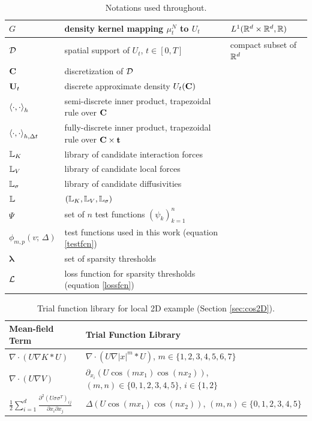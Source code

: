 \documentclass[english,reqno]{amsart}
\begin{document}
{\begin{table}
\begin{center}
\begin{tabular}{|p{2.8cm}p{10cm}p{3.5cm}|}
$G$ & density kernel mapping $\mu^N_t$ to $U_t$ & $L^1(\mathbb{R}^d\times\mathbb{R}^d, \mathbb{R})$\\\hline
${\mathcal{D}}$ & spatial support of $U_t$, $t\in[0,T]$ & compact subset of $\mathbb{R}^d$ \\\hline
$\mathbf{C}$ & discretization of ${\mathcal{D}}$ &  \\\hline
$\mathbf{U}_t$ & discrete approximate density $U_t(\mathbf{C})$ &  \\\hline
$\left\langle \cdot,\cdot\right\rangle_h$ & \raggedright semi-discrete inner product, trapezoidal rule over $\mathbf{C}$ &  \\\hline
$\left\langle \cdot,\cdot\right\rangle_{h,\Delta t}$ & fully-discrete inner product, trapezoidal rule  over $\mathbf{C}\times \mathbf{t}$ &  \\\hline
$\mathbb{L}_K$ & library of candidate interaction forces &  \\ \hline
$\mathbb{L}_V$ & library of candidate local forces &  \\ \hline
$\mathbb{L}_\sigma$ & library of candidate diffusivities &  \\ \hline
$\mathbb{L}$ & $(\mathbb{L}_K,\mathbb{L}_V,\mathbb{L}_\sigma)$ &  \\ \hline
$\Psi$ & set of $n$ test functions $(\psi_k)_{k=1}^n$ & \\ \hline
$\phi_{m,p}(v;\, \Delta)$ & test functions used in this work (equation \eqref{testfcn}) & \\  \hline
$\pmb{\lambda}$ & set of sparsity thresholds &  \\  \hline
${\mathcal{L}}$ & loss function for sparsity thresholds (equation \eqref{lossfcn}) & \\ \hline
\end{tabular}
\end{center}
\caption{Notations used throughout.}
\end{table}}

\begin{table}
\begin{center}
\begin{tabular}{|l|l|}
\hline
Mean-field Term & Trial Function Library  \\\hline
$\nabla \cdot(U\nabla K*U)$ & $\nabla \cdot(U\nabla |x|^m*U)$, $m\in \{1, 2,3,4,5,6, 7\}$ \\ \hline
$\nabla \cdot(U\nabla V)$ & $\partial_{x_i}\left(U\cos(m x_1)\cos(n x_2)\right)$, $(m,n)\in\{0,1,2,3,4,5\}$, $i\in\{1,2\}$ \\\hline
$\frac{1}{2}\sum_{i=1}^d \frac{\partial^2(U\sigma\sigma^T)_{ij}}{\partial x_i\partial x_j}$ & $\Delta (U\cos(m x_1)\cos(n x_2))$, $(m,n)\in\{0,1,2,3,4,5\}$  \\ \hline
\end{tabular}
\end{center}
\caption{Trial function library for local 2D example (Section \ref{sec:cos2D}).}\label{coslib}
\end{table}
\end{document}
